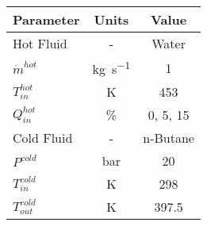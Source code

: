 \begin{tabular}{|p{2.5cm} c c|}
    \hline
    \rowcolor{bluepoli!40} %
    \textbf{Parameter} & \textbf{Units} & \textbf{Value} \T\B \\
    \hline \hline
    Hot Fluid & - & Water \T\B\\
    \(\Dot{m}^{hot}\) & \unit{\kg\per\s} & \num{1}\T\B\\
    \(T_{in}^{hot}\) & \unit{\K} & \num{453} \T\B\\
    \(Q_{in}^{hot}\) & \unit{\percent} & \num{0}, \num{5}, \num{15} \T\B\\
    \hline
    Cold Fluid & - & n-Butane \T\B\\
    \(P^{cold}\) & \unit{\bar} & \num{20} \T\B\\
    \(T_{in}^{cold}\) & \unit{\K} & \num{298} \T\B\\
    \(T_{out}^{cold}\) & \unit{\K} & \num{397.5} \T\B\\
    \hline
\end{tabular}